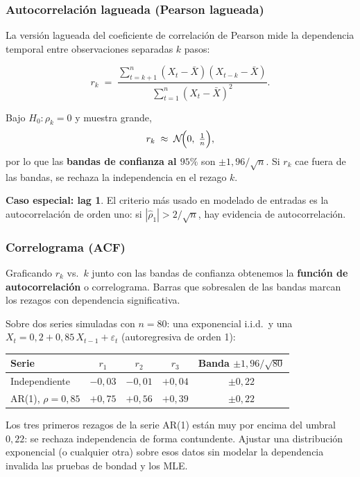 \documentclass[11pt, letterpaper]{article}
\begin{document}
\subsubsection{Autocorrelación lagueada (Pearson lagueada)}

La versión lagueada del coeficiente de correlación de Pearson mide la dependencia temporal entre observaciones separadas $k$ pasos:

\[
r_k \;=\; \frac{\sum_{t=k+1}^{n}(X_t-\bar X)(X_{t-k}-\bar X)}{\sum_{t=1}^{n}(X_t-\bar X)^2}.
\]

Bajo $H_0: \rho_k = 0$ y muestra grande,
\[
r_k \;\approx\; \mathcal{N}\!\Bigl(0,\; \tfrac{1}{n}\Bigr),
\]
por lo que las \textbf{bandas de confianza al $95\%$} son $\pm 1{,}96/\sqrt{n}$. Si $r_k$ cae fuera de las bandas, se rechaza la independencia en el rezago $k$.

\textbf{Caso especial: lag 1}. El criterio más usado en modelado de entradas es la autocorrelación de orden uno: si $|\hat\rho_1| > 2/\sqrt{n}$, hay evidencia de autocorrelación.

\subsubsection{Correlograma (ACF)}

Graficando $r_k$ vs.\ $k$ junto con las bandas de confianza obtenemos la \textbf{función de autocorrelación} o correlograma. Barras que sobresalen de las bandas marcan los rezagos con dependencia significativa.

\begin{ejemplobox}
Sobre dos series simuladas con $n=80$: una exponencial i.i.d.\ y una $X_t = 0{,}2 + 0{,}85\,X_{t-1} + \varepsilon_t$ (autoregresiva de orden 1):

\begin{center}\small
\renewcommand{\arraystretch}{1.2}
\begin{tabular}{lcccc}
\toprule
\textbf{Serie} & $r_1$ & $r_2$ & $r_3$ & \textbf{Banda $\pm 1{,}96/\sqrt{80}$} \\
\midrule
Independiente & $-0{,}03$ & $-0{,}01$ & $+0{,}04$ & $\pm 0{,}22$ \\
AR(1), $\rho=0{,}85$ & $+0{,}75$ & $+0{,}56$ & $+0{,}39$ & $\pm 0{,}22$ \\
\bottomrule
\end{tabular}
\end{center}

Los tres primeros rezagos de la serie AR(1) están muy por encima del umbral $0{,}22$: se rechaza independencia de forma contundente. Ajustar una distribución exponencial (o cualquier otra) sobre esos datos sin modelar la dependencia invalida las pruebas de bondad y los MLE.
\end{ejemplobox}
\end{document}
